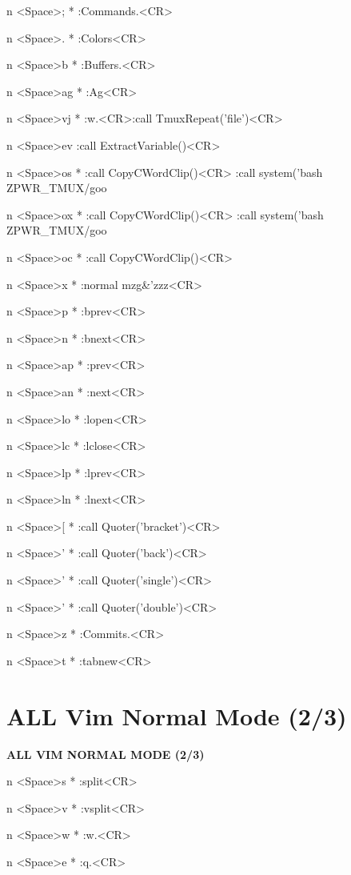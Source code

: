 \documentclass[11pt,a4paper,twoside]{book}
\begin{document}
n  <Space>;  * :Commands.<CR>

n  <Space>.  * :Colors<CR>

n  <Space>b  * :Buffers.<CR>

n  <Space>ag  * :Ag<CR>

n  <Space>vj  * :w.<CR>:call TmuxRepeat('file')<CR>

n  <Space>ev  :call ExtractVariable()<CR>

n  <Space>os  * :call CopyCWordClip()<CR> :call system('bash ZPWR\_TMUX/goo

n  <Space>ox  * :call CopyCWordClip()<CR> :call system('bash ZPWR\_TMUX/goo

n  <Space>oc  * :call CopyCWordClip()<CR>

n  <Space>x  * :normal mzg\&'zzz<CR>

n  <Space>p  * :bprev<CR>

n  <Space>n  * :bnext<CR>

n  <Space>ap  * :prev<CR>

n  <Space>an  * :next<CR>

n  <Space>lo  * :lopen<CR>

n  <Space>lc  * :lclose<CR>

n  <Space>lp  * :lprev<CR>

n  <Space>ln  * :lnext<CR>

n  <Space>[  * :call Quoter('bracket')<CR>

n  <Space>'  * :call Quoter('back')<CR>

n  <Space>'  * :call Quoter('single')<CR>

n  <Space>'  * :call Quoter('double')<CR>

n  <Space>z  * :Commits.<CR>

n  <Space>t  * :tabnew<CR>


\vspace{16pt}

\section{ALL Vim Normal Mode (2/3)}


\vspace{10pt}
{\large\bfseries\color{neoncyan} ALL VIM NORMAL MODE (2/3)}\vspace{6pt}

n  <Space>s  * :split<CR>

n  <Space>v  * :vsplit<CR>

n  <Space>w  * :w.<CR>

n  <Space>e  * :q.<CR>
\end{document}
